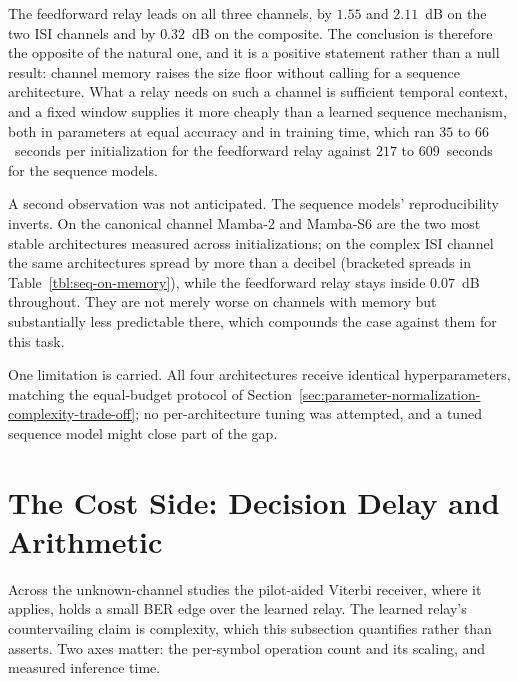 The feedforward relay leads on all three channels, by $1.55$ and $2.11$~dB on the two ISI channels and by $0.32$~dB on the composite. The conclusion is therefore the opposite of the natural one, and it is a positive statement rather than a null result: channel memory raises the size floor without calling for a sequence architecture. What a relay needs on such a channel is sufficient temporal context, and a fixed window supplies it more cheaply than a learned sequence mechanism, both in parameters at equal accuracy and in training time, which ran $35$ to $66$~seconds per initialization for the feedforward relay against $217$ to $609$~seconds for the sequence models.

A second observation was not anticipated. The sequence models' reproducibility inverts. On the canonical channel Mamba-2 and Mamba-S6 are the two most stable architectures measured across initializations; on the complex ISI channel the same architectures spread by more than a decibel (bracketed spreads in Table~\ref{tbl:seq-on-memory}), while the feedforward relay stays inside $0.07$~dB throughout. They are not merely worse on channels with memory but substantially less predictable there, which compounds the case against them for this task.

One limitation is carried. All four architectures receive identical hyperparameters, matching the equal-budget protocol of Section~\ref{sec:parameter-normalization-complexity-trade-off}; no per-architecture tuning was attempted, and a tuned sequence model might close part of the gap.

\section{The Cost Side: Decision Delay and Arithmetic}\label{sec:complexity-viterbi-mlp}

Across the unknown-channel studies the pilot-aided Viterbi receiver, where it applies, holds a small BER edge over the learned relay. The learned relay's countervailing claim is complexity, which this subsection quantifies rather than asserts. Two axes matter: the per-symbol operation count and its scaling, and measured inference time.

